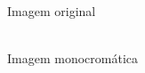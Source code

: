 \documentclass[12pt, letterpaper]{article}
\begin{document}
    \begin{figure}[H]
    \centering
    \begin{minipage}{.4\textwidth}
        \centering
        \\ {Imagem original}
    \end{minipage}
    \begin{minipage}{.4\textwidth}
        \centering
        \\ {Imagem monocromática}
    \end{minipage}
    \end{figure}
\end{document}
